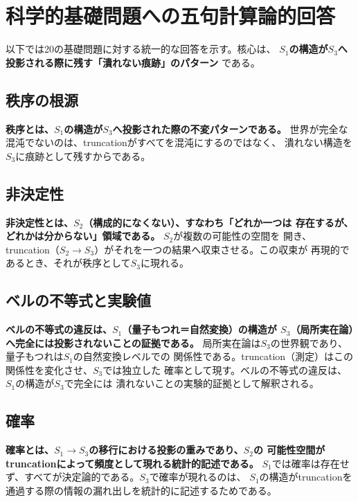 \documentclass[11pt,a4paper]{ltjsarticle}
\theoremstyle{remark}
\begin{document}
\section{科学的基礎問題への五句計算論的回答}
\label{sec:foundations}

以下では20の基礎問題に対する統一的な回答を示す。核心は、
\textbf{$S_1$の構造が$S_3$へ投影される際に残す「潰れない痕跡」のパターン}
である。

\subsection{秩序の根源}

\textbf{秩序とは、$S_1$の構造が$S_3$へ投影された際の不変パターンである。}
世界が完全な混沌でないのは、truncationがすべてを混沌にするのではなく、
潰れない構造を$S_3$に痕跡として残すからである。

\subsection{非決定性}

\textbf{非決定性とは、$S_2$（構成的になくない）、すなわち「どれか一つは
存在するが、どれかは分からない」領域である。} $S_2$が複数の可能性の空間を
開き、truncation（$S_2\to S_3$）がそれを一つの結果へ収束させる。この収束が
再現的であるとき、それが秩序として$S_3$に現れる。

\subsection{ベルの不等式と実験値}

\textbf{ベルの不等式の違反は、$S_1$（量子もつれ＝自然変換）の構造が
$S_3$（局所実在論）へ完全には投影されないことの証拠である。}
局所実在論は$S_3$の世界観であり、量子もつれは$S_1$の自然変換レベルでの
関係性である。truncation（測定）はこの関係性を変化させ、$S_3$では独立した
確率として現す。ベルの不等式の違反は、$S_1$の構造が$S_3$で完全には
潰れないことの実験的証拠として解釈される\cite{Bell1964}。

\subsection{確率}

\textbf{確率とは、$S_1\to S_3$の移行における投影の重みであり、$S_2$の
可能性空間がtruncationによって頻度として現れる統計的記述である。}
$S_1$では確率は存在せず、すべてが決定論的である。$S_3$で確率が現れるのは、
$S_1$の構造がtruncationを通過する際の情報の漏れ出しを統計的に記述するためである。
\end{document}
